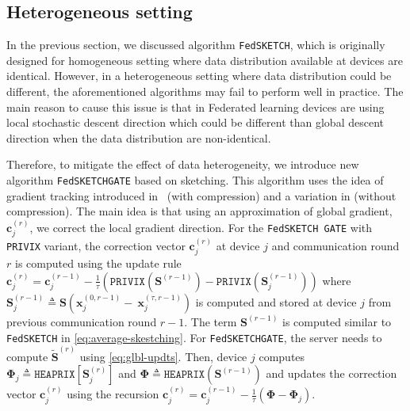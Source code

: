 \documentclass[review,onefignum,onetabnum]{siamart190516}
\begin{document}
\subsection{Heterogeneous setting}
In the previous section, we discussed algorithm \texttt{FedSKETCH}, which is originally designed for homogeneous setting where data distribution available at devices are identical. However, in a heterogeneous setting where data distribution could be different, the aforementioned algorithms may fail to perform well in practice. The main reason to cause this issue is that in Federated learning devices are using local stochastic descent direction which could be different than global descent direction when the data distribution are non-identical. 

Therefore, to mitigate the effect of data heterogeneity, we introduce new algorithm \texttt{FedSKETCHGATE} based on sketching. This algorithm uses the idea of gradient tracking introduced in~\cite{haddadpour2020federated} (with compression) and a variation in \cite{liang2019variance} (without compression). The main idea is that using an approximation of global gradient, $\mathbf{c}_j^{(r)}$, we correct the local gradient direction. For the \texttt{FedSKETCH GATE} with \texttt{PRIVIX} variant, the correction vector $\mathbf{c}_j^{(r)}$ at device $j$ and communication round $r$ is computed using the update rule $\mathbf{c}_j^{(r)}=\mathbf{c}_j^{(r-1)}-\frac{1}{\tau}\left({\texttt{PRIVIX}}\left(\mathbf{S}^{(r-1)}\right)-{\texttt{PRIVIX}}\left(\mathbf{S}^{(r-1)}_{j}\right)\right)$ where $\mathbf{S}^{(r-1)}_{j}\triangleq\mathbf{S}\left(\boldsymbol{x}_j^{(0,r-1)}-~{\boldsymbol{x}}_{j}^{(\tau,r-1)}\right)$ is computed and stored at device $j$ from previous communication round $r-1$. The term $\mathbf{S}^{(r-1)}$ is computed similar to \texttt{FedSKETCH} in \eqref{eq:average-skestching}. 
For \texttt{FedSKETCHGATE}, the server needs to compute $\tilde{\mathbf{S}}^{(r)}$ using \eqref{eq:glbl-updts}. 
Then, device $j$ computes $\mathbf{\Phi}_j\triangleq \texttt{HEAPRIX}[\mathbf{S}_j^{(r)}]$ and $  {\mathbf{\Phi}}\triangleq \texttt{HEAPRIX}(\mathbf{S}^{(r-1)})$ and updates the correction vector $\mathbf{c}_j^{(r)}$ using the recursion $\mathbf{c}_j^{(r)}=\mathbf{c}_j^{(r-1)}-\frac{1}{\tau}\left(\mathbf{\Phi}-\mathbf{\Phi}_j\right)$.
\vspace{-0.4cm}
\end{document}
